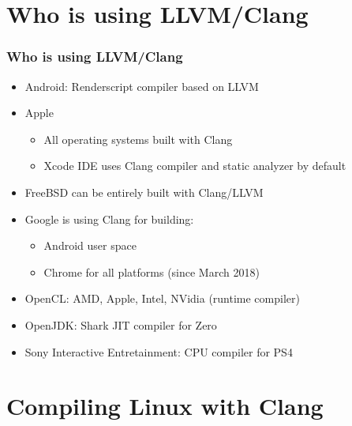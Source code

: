 \documentclass{smilebeamer}
\begin{document}
\section{Who is using LLVM/Clang}

\begin{frame}
\frametitle{Who is using LLVM/Clang}
\begin{itemize}
  \item Android: Renderscript compiler based on LLVM
  \item Apple
  \begin{itemize}
    \item All operating systems built with Clang
    \item Xcode IDE uses Clang compiler and static analyzer by default
  \end{itemize}
  \item FreeBSD can be entirely built with Clang/LLVM
  \item Google is using Clang for building:
  \begin{itemize}
    \item Android user space
    \item Chrome for all platforms (since March 2018)
  \end{itemize}
  \item OpenCL: AMD, Apple, Intel, NVidia (runtime compiler)
  \item OpenJDK: Shark JIT compiler for Zero
  \item Sony Interactive Entretainment: CPU compiler for PS4
\end{itemize}
\end{frame}
\section{Compiling Linux with Clang}
\end{document}
